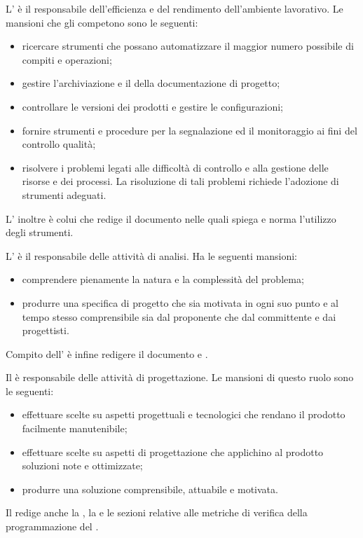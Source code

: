 \documentclass[a4paper, titlepage]{article}
\begin{document}
L' è il responsabile dell'efficienza e del rendimento dell'ambiente lavorativo. Le mansioni che gli competono sono le seguenti:
\begin{itemize}
	\item ricercare strumenti che possano automatizzare il maggior numero possibile di compiti e operazioni;
	\item gestire l'archiviazione e il  della documentazione di progetto;
	\item controllare le versioni dei prodotti e gestire le configurazioni;
	\item fornire strumenti e procedure per la segnalazione ed il monitoraggio ai fini del controllo qualità;
	\item risolvere i problemi legati alle difficoltà di controllo e alla gestione delle risorse e dei processi. La risoluzione di tali problemi richiede l'adozione di strumenti adeguati.
\end{itemize}
L' inoltre è colui che redige il documento  nelle quali spiega e norma l'utilizzo degli strumenti.

L' è il responsabile delle attività di analisi. Ha le seguenti mansioni:
\begin{itemize}
	\item comprendere pienamente la natura e la complessità del problema;
	\item produrre una specifica di progetto che sia motivata in ogni suo punto e al tempo stesso comprensibile sia dal proponente che dal committente e dai progettisti.
\end{itemize}
Compito dell' è infine redigere il documento  e .

Il  è responsabile delle attività di progettazione. Le mansioni di questo ruolo sono le seguenti:
\begin{itemize}
	\item effettuare scelte su aspetti progettuali e tecnologici che rendano il prodotto facilmente manutenibile;
	\item effettuare scelte su aspetti di progettazione che applichino al prodotto soluzioni note e ottimizzate;
	\item produrre una soluzione comprensibile, attuabile e motivata.
\end{itemize}
Il  redige anche la , la  e le sezioni relative alle metriche di verifica della programmazione del .
\end{document}
